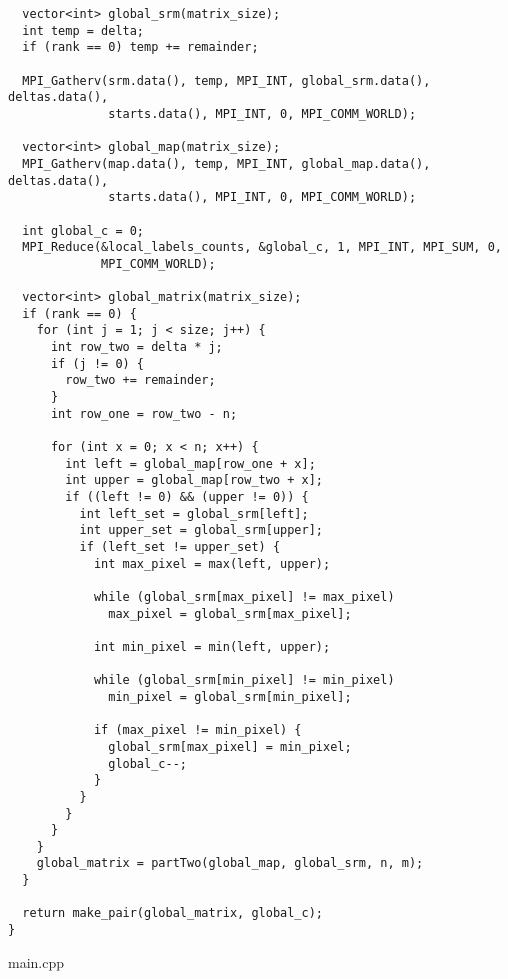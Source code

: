 \documentclass{report}
\begin{document}
\begin{lstlisting}
  vector<int> global_srm(matrix_size);
  int temp = delta;
  if (rank == 0) temp += remainder;

  MPI_Gatherv(srm.data(), temp, MPI_INT, global_srm.data(), deltas.data(),
              starts.data(), MPI_INT, 0, MPI_COMM_WORLD);

  vector<int> global_map(matrix_size);
  MPI_Gatherv(map.data(), temp, MPI_INT, global_map.data(), deltas.data(),
              starts.data(), MPI_INT, 0, MPI_COMM_WORLD);

  int global_c = 0;
  MPI_Reduce(&local_labels_counts, &global_c, 1, MPI_INT, MPI_SUM, 0,
             MPI_COMM_WORLD);

  vector<int> global_matrix(matrix_size);
  if (rank == 0) {
    for (int j = 1; j < size; j++) {
      int row_two = delta * j;
      if (j != 0) {
        row_two += remainder;
      }
      int row_one = row_two - n;

      for (int x = 0; x < n; x++) {
        int left = global_map[row_one + x];
        int upper = global_map[row_two + x];
        if ((left != 0) && (upper != 0)) {
          int left_set = global_srm[left];
          int upper_set = global_srm[upper];
          if (left_set != upper_set) {
            int max_pixel = max(left, upper);

            while (global_srm[max_pixel] != max_pixel)
              max_pixel = global_srm[max_pixel];

            int min_pixel = min(left, upper);

            while (global_srm[min_pixel] != min_pixel)
              min_pixel = global_srm[min_pixel];

            if (max_pixel != min_pixel) {
              global_srm[max_pixel] = min_pixel;
              global_c--;
            }
          }
        }
      }
    }
    global_matrix = partTwo(global_map, global_srm, n, m);
  }

  return make_pair(global_matrix, global_c);
}
\end{lstlisting}
main.cpp
\end{document}
